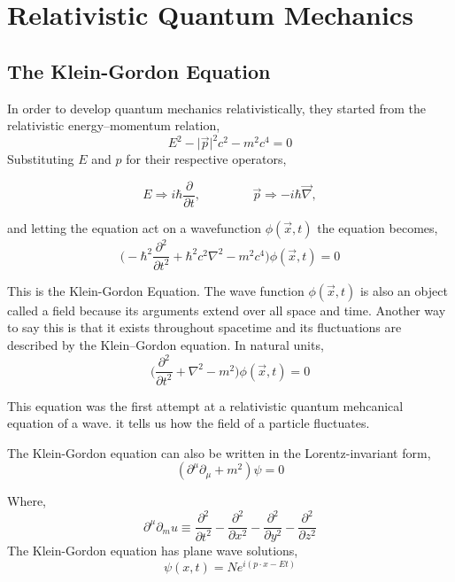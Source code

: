 \chapter{Relativistic Quantum Mechanics}
\section{The Klein-Gordon Equation}
In order to develop quantum mechanics relativistically, they started from the relativistic
energy–momentum relation,
\begin{equation}
	E^2 - \big|\vec{p}\big|^2c^2 -m^2c^4 = 0
\end{equation}
Substituting $E$ and $p$ for their respective operators,

$$E \Rightarrow i\hbar\frac{\partial }{\partial t},\hspace{50pt}\vec{p} \Rightarrow -i\hbar\vec{\nabla},$$ 

and letting the equation act on a wavefunction $\phi(\vec{x} , t)$  the equation becomes,
\begin{equation}
	\Big( -\hbar^2\frac{\partial^2 }{\partial t^2} + \hbar^2c^2\nabla^2 - m^2c^4 \Big)\phi(\vec{x} , t) = 0
\end{equation}

This is the Klein-Gordon Equation. The wave function $\phi(\vec{x} , t)$ is also an object called a field because its arguments extend over all space and time. Another way to say this is that it exists
throughout spacetime and its fluctuations are described by the Klein–Gordon
equation. In natural units,
$$\Big( \frac{\partial^2}{\partial t^2} + \nabla^2 - m^2 \Big)\phi(\vec{x},t) = 0$$

This equation was the first attempt at a relativistic quantum mehcanical equation of a wave. it tells us how the field of a particle fluctuates.

The Klein-Gordon equation can also be written in the Lorentz-invariant form,
\begin{equation}
	(\partial^\mu\partial_\mu+m^2)\psi=0
\end{equation}

Where,
\begin{equation*}
	\partial^\mu\partial_mu\equiv\frac{\partial^2}{\partial t^2}- \frac{\partial^2}{\partial x^2}-\frac{\partial^2}{\partial y^2}-\frac{\partial^2}{\partial z^2}
\end{equation*}
The Klein-Gordon equation has plane wave solutions,
\begin{equation}
	\psi(x,t)=Ne^{i(p\cdot x-Et)}
\end{equation}

